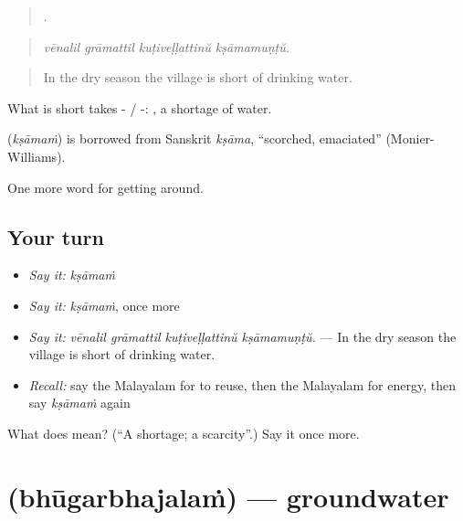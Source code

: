 \begin{quote}
   .
\end{quote}

\begin{quote}
\emph{vēnalil grāmattil kuṭiveḷḷattinŭ kṣāmamuṇṭŭ.}
\end{quote}

\begin{quote}
In the dry season the village is short of drinking water.
\end{quote}

What is short takes - / -:  , a shortage of water.

\begin{cousinweb}
\textbf{} (\emph{kṣāmaṁ}) is borrowed from Sanskrit \emph{kṣāma}, \textquotedblleft{}scorched, emaciated\textquotedblright{} (Monier-Williams).
\end{cousinweb}

\begin{grammarlens}[title={What you've built}]
One more word for getting around.
\end{grammarlens}

\subsection*{Your turn}
\begin{itemize}
\raggedright
  \item \emph{Say it:} \emph{kṣāmaṁ}
  \item \emph{Say it:} \emph{kṣāmaṁ}, once more
  \item \emph{Say it:} \emph{vēnalil grāmattil kuṭiveḷḷattinŭ kṣāmamuṇṭŭ.} — In the dry season the village is short of drinking water.
  \item \emph{Recall:} say the Malayalam for to reuse, then the Malayalam for energy, then say \emph{kṣāmaṁ} again
\end{itemize}

\begin{tcolorbox}[breakable,colback=teal!4,colframe=teal!35!black,title={Before you move on}]
What does  mean? (\textquotedblleft{}A shortage; a scarcity\textquotedblright{}.) Say it once more.
\end{tcolorbox}
\section[\texorpdfstring{\ml{ഭൂഗർഭജലം} (bhūgarbhajalaṁ)}{ഭൂഗർഭജലം (bhūgarbhajalaṁ)}]{ (bhūgarbhajalaṁ) — groundwater}

